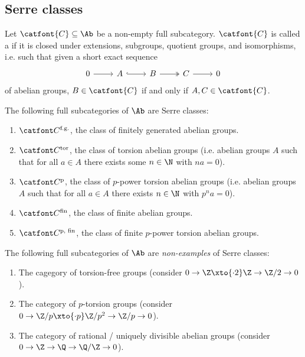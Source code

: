 \subsection{Serre classes}
\begin{definition}
	Let $\catfont{C} \subseteq \Ab$ be a non-empty full subcategory.
	$\catfont{C}$ is called a  if it is closed under extensions, subgroups, quotient groups, and isomorphisms, i.e. such that given a short exact sequence 
	\begin{equation*}
		\begin{tikzcd}
			0 
					\ar[r]
				& A
					\ar[r, hook]
				& B
					\ar[r, two heads]
				& C
					\ar[r]
				& 0
		\end{tikzcd}
	\end{equation*}
	of abelian groups, $B \in \catfont{C}$ if and only if $A, C \in \catfont{C}$.
\end{definition}
\begin{example}
	The following full subcategories of $\Ab$ are Serre classes:	
	\begin{enumerate}
		\item $\Cfg$, the class of finitely generated abelian groups.
		\item $\Ctor$, the class of torsion abelian groups (i.e. abelian groups $A$ such that for all $a \in A$ there exists some $n \in \N$ with $n a = 0$).
		\item $\Cptor$, the class of $p$-power torsion abelian groups (i.e. abelian groups $A$ such that for all $a \in A$ there exists $n \in \N$ with $p^n a = 0$).
		\item $\Cfin$, the class of finite abelian groups.
		\item $\Cfinp$, the class of finite $p$-power torsion abelian groups.
	\end{enumerate}
\end{example}
\begin{example}
	The following full subcategories of $\Ab$ are \emph{non-examples} of Serre classes:
	\begin{enumerate}
		\item The cagegory of torsion-free groups (consider $0 \to \Z \xto{\cdot 2} \Z \to \Zn{2} \to 0$).
		\item The category of $p$-torsion groups (consider $0 \to \Zn{p} \xto{\cdot p} \Zn{p^2} \to \Zn{p} \to 0$).
		\item The category of rational / uniquely divisible abelian groups (consider $0 \to \Z \to \Q \to \Q / \Z \to 0$).
	\end{enumerate}
\end{example}
